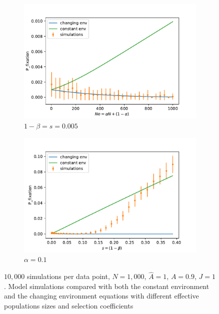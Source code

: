 \documentclass[11pt]{article}
\begin{document}
\begin{figure}[t]
  \begin{center}
  \begin{subfigure}[a]{0.49\linewidth}
  \caption{$1-\beta=s=0.005$}
    \includegraphics[width=\linewidth]{../figures/changed_env/ch_env_var_alpha.pdf}
   \end{subfigure}
   \begin{subfigure}[a]{0.49\linewidth}
   \caption{$\alpha=0.1$}
    \includegraphics[width=\linewidth]{../figures/changed_env/ch_env_var_beta.pdf}
   \end{subfigure}
  \end{center}
  \caption{$10,000$ simulations per data point, $N=1,000$, $\hat{A}=1$, $A=0.9$, $J=1$.
  Model simulations compared with both the constant environment and the changing environment equations with different effective populations sizes and selection coefficients}
  \label{fig:ch_env_alpha_beta}
\end{figure}
\end{document}
